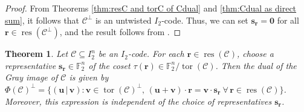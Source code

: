 \documentclass[12pt]{article}
\newtheorem{theorem}{Theorem}[section]
\theoremstyle{definition}
\theoremstyle{plain}
\newcommand{\Blue}[1]{{ \color{blue} #1}}
\begin{document}
\begin{proof}
From Theorems \ref{thm:resC and torC of Cdual} and \ref{thm:Cdual as direct sum}, it follows that $\mathcal{C}^\perp$ is an untwisted $I_2$-code. Thus, we can set $\mathbf{s}_{\mathbf{r}} = \mathbf{0}$ for all $\mathbf{r} \in \operatorname{res} ( \mathcal{C}^\perp )$, and the result follows from .
\end{proof}




%



\begin{theorem}   \label{thm:dual-phi}
Let $\mathcal{C} \subseteq I_2^n$ be an $I_2$-code. For each
$\mathbf{r} \in \operatorname{res}(\mathcal{C})$, choose a representative
$\mathbf{s}_{\mathbf{r}} \in \mathbb{F}_2^n$ of the coset
$\tau (\mathbf{r}) \in \mathbb{F}_2^n / \operatorname{tor}(\mathcal{C})$. Then the dual of the Gray image of $\mathcal{C}$ is given by
$
\Phi(\mathcal{C})^\perp
=
\{
(\mathbf{u} \, | \, \mathbf{v})    \mathrel{:}
\mathbf{v} \in \operatorname{tor} ( \mathcal{C} )^\perp
,  \,
(\mathbf{u} + \mathbf{v}) \cdot \mathbf{r}
=
\mathbf{v} \cdot \mathbf{s}_{\mathbf{r}}  \
\forall \, \mathbf{r} \in \operatorname{res} ( \mathcal{C} )
\}
$.
Moreover, this expression is independent of the choice of representatives $\mathbf{s}_{\mathbf{r}}$.
\end{theorem}
\end{document}
